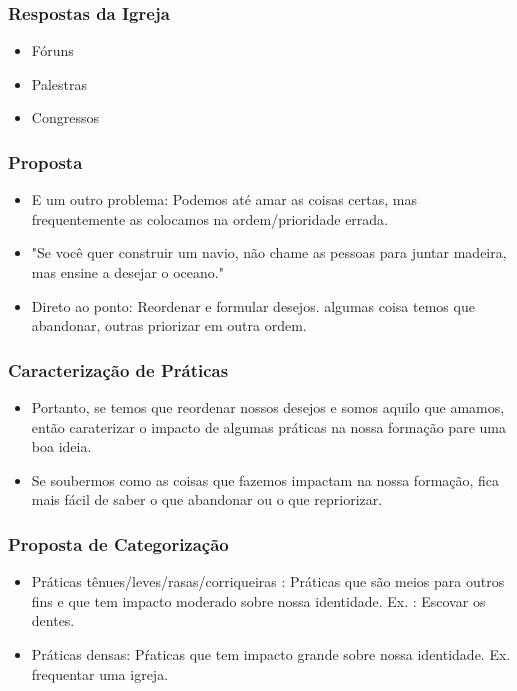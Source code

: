 \begin{frame}
	\frametitle{Respostas da Igreja}
    \begin{itemize}
        \item Fóruns
        \item Palestras
        \item Congressos 
    \end{itemize}
\end{frame}

\begin{frame}
	\frametitle{Proposta}
    \begin{itemize}
        \item <1>E um outro problema: Podemos até amar as coisas certas, mas frequentemente as colocamos na ordem/prioridade errada.\footnotemark
        \item <2>"Se você quer construir um navio, não chame as pessoas para juntar madeira, mas ensine a desejar o oceano." \footnotemark
        \item <2>Direto ao ponto: Reordenar e formular desejos. algumas coisa temos que abandonar, outras priorizar em outra ordem.
    \end{itemize}

\end{frame}


\begin{frame}
	\frametitle{Caracterização de Práticas}

    \begin{itemize}
        \item <1> Portanto, se temos que reordenar nossos desejos e somos aquilo que amamos, então caraterizar o impacto de algumas práticas na nossa formação pare uma boa ideia.
        \item <2> Se soubermos como as coisas que fazemos impactam na nossa formação, fica mais fácil de saber o que abandonar ou o que repriorizar.
    \end{itemize}
\end{frame}

\begin{frame}
	\frametitle{Proposta de Categorização}

    \begin{itemize}
        \item Práticas tênues/leves/rasas/corriqueiras : Práticas que são meios para outros fins e que tem impacto moderado sobre nossa identidade. Ex. : Escovar os dentes.
        \item Práticas densas: Pŕaticas que tem impacto grande sobre nossa identidade. Ex. frequentar uma igreja.
    \end{itemize}
\end{frame}

